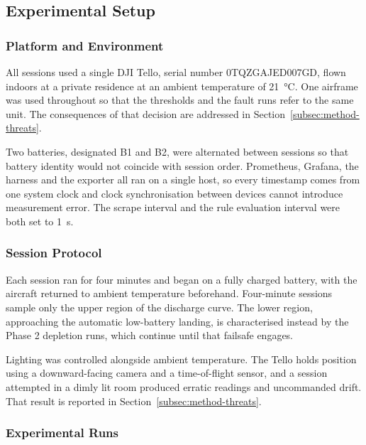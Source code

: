 \subsection{Experimental Setup}\label{sec:rq2-setup}

\subsubsection{Platform and Environment}\label{sec:rq2-platform-setup}

All sessions used a single DJI Tello, serial number 0TQZGAJED007GD, flown
indoors at a private residence at an ambient temperature of \SI{21}{\celsius}.
One airframe was used throughout so that the thresholds and the fault runs refer
to the same unit. The consequences of that decision are addressed in
Section~\ref{subsec:method-threats}.

Two batteries, designated B1 and B2, were alternated between sessions so that
battery identity would not coincide with session order. Prometheus, Grafana, the
harness and the exporter all ran on a single host, so every timestamp comes from
one system clock and clock synchronisation between devices cannot introduce
measurement error. The scrape interval and the rule evaluation interval were
both set to \SI{1}{\second}.

\subsubsection{Session Protocol}\label{sec:rq2-protocol}

Each session ran for four minutes and began on a fully charged battery, with the
aircraft returned to ambient temperature beforehand. Four-minute sessions sample
only the upper region of the discharge curve. The lower region, approaching the
automatic low-battery landing, is characterised instead by the Phase 2 depletion
runs, which continue until that failsafe engages.

Lighting was controlled alongside ambient temperature. The Tello holds position
using a downward-facing camera and a time-of-flight sensor, and a session
attempted in a dimly lit room produced erratic readings and uncommanded drift.
That result is reported in Section~\ref{subsec:method-threats}.

\subsubsection{Experimental Runs}\label{sec:rq2-runs}

